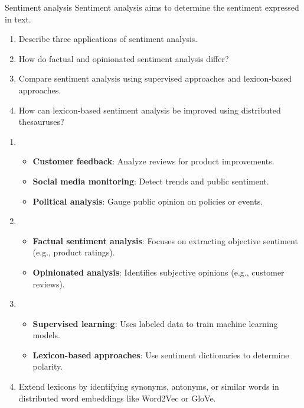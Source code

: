 \documentclass{article}
\begin{document}
\begin{exercise}{Sentiment analysis}\label{ex:sent-analysis}
  Sentiment analysis aims to determine the sentiment expressed in text.
  \begin{enumerate}
    \item Describe three applications of sentiment analysis.
    \item How do factual and opinionated sentiment analysis differ?
    \item Compare sentiment analysis using supervised approaches and lexicon-based approaches.
    \item How can lexicon-based sentiment analysis be improved using distributed thesauruses?
  \end{enumerate}

  \begin{solution}
    \begin{enumerate}
        \item \begin{itemize}
            \item \textbf{Customer feedback}: Analyze reviews for product improvements.
            \item \textbf{Social media monitoring}: Detect trends and public sentiment.
            \item \textbf{Political analysis}: Gauge public opinion on policies or events.
          \end{itemize}
        \item \begin{itemize}
            \item \textbf{Factual sentiment analysis}: Focuses on extracting objective sentiment (e.g., product ratings).
            \item \textbf{Opinionated analysis}: Identifies subjective opinions (e.g., customer reviews).
          \end{itemize}
        \item \begin{itemize}
            \item \textbf{Supervised learning}: Uses labeled data to train machine learning models.
            \item \textbf{Lexicon-based approaches}: Use sentiment dictionaries to determine polarity.
          \end{itemize}
        \item Extend lexicons by identifying synonyms, antonyms, or similar words in distributed word embeddings like Word2Vec or GloVe.
      \end{enumerate}
  \end{solution}
\end{exercise}
\end{document}

